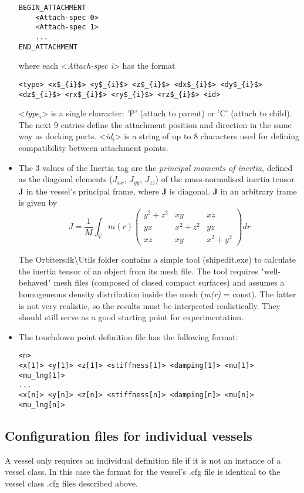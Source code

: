 \documentclass[Orbiter Developer Manual.tex]{subfiles}
\begin{document}
\begin{itemize}
\begin{lstlisting}[language=OSFS]
BEGIN_ATTACHMENT
	<Attach-spec 0>
	<Attach-spec 1>
	...
END_ATTACHMENT
\end{lstlisting}

\noindent
where each <\textit{Attach-spec i}> has the format

\begin{lstlisting}[language=OSFS,mathescape=true]
<type> <x$_{i}$> <y$_{i}$> <z$_{i}$> <dx$_{i}$> <dy$_{i}$> <dz$_{i}$> <rx$_{i}$> <ry$_{i}$> <rz$_{i}$> <id>
\end{lstlisting}

\noindent
<\textit{type}$_{i}$> is a single character: 'P' (attach to parent) or 'C' (attach to child). The next 9 entries define the attachment position and direction in the same way as docking ports. <\textit{id}$_{i}$> is a string of up to 8 characters used for defining compatibility between attachment points.

\item The 3 values of the Inertia tag are the \textit{principal moments of inertia}, defined as the diagonal elements ($J_{xx}$, $J_{yy}$, $J_{zz}$) of the mass-normalised inertia tensor \textbf{J} in the vessel's principal frame, where \textbf{J} is diagonal. \textbf{J} in an arbitrary frame is given by
\[ J = \frac{1}{M} \int_{V} m(r)  
\begin{pmatrix}
y^{2} + z^{2} & xy & xz\\
yx & x^{2} + z^{2} & yz\\
xz & xy & x^{2} + y^{2}
\end{pmatrix}
dr
\]

\noindent
The Orbitersdk\textbackslash Utils folder contains a simple tool (shipedit.exe) to calculate the inertia tensor of an object from its mesh file. The tool requires "well-behaved" mesh files (composed of closed compact surfaces) and assumes a homogeneous density distribution inside the mesh (\textit{m(r)} = const). The latter is not very realistic, so the results must be interpreted realistically. They should still serve as a good starting point for experimentation.

\item The touchdown point definition file has the following format:
\begin{lstlisting}[language=OSFS]
<n>
<x[1]> <y[1]> <z[1]> <stiffness[1]> <damping[1]> <mu[1]> <mu_lng[1]>
...
<x[n]> <y[n]> <z[n]> <stiffness[n]> <damping[n]> <mu[n]> <mu_lng[n]>
\end{lstlisting}

\end{itemize}


\subsection{Configuration files for individual vessels}
A vessel only requires an individual definition file if it is not an instance of a vessel class. In this case the format for the vessel's .cfg file is identical to the vessel class .cfg files described above.
\end{document}
